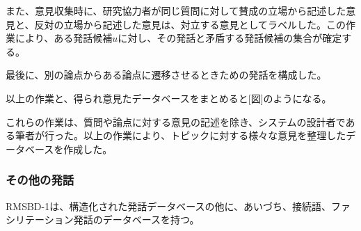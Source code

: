 \documentclass[11pt, a4paper]{jreport} %
\begin{document}
\begin{enumerate}
また、意見収集時に、研究協力者が同じ質問に対して賛成の立場から記述した意見と、反対の立場から記述した意見は、対立する意見としてラベルした。この作業により、ある発話候補$u$に対し、その発話と矛盾する発話候補の集合が確定する。


最後に、別の論点からある論点に遷移させるときための発話を構成した。



以上の作業と、得られ意見たデータベースをまとめると[図]のようになる。


これらの作業は、質問や論点に対する意見の記述を除き、システムの設計者である筆者が行った。以上の作業により、トピックに対する様々な意見を整理したデータベースを作成した。
\end{enumerate}
\subsubsection*{その他の発話}
RMSBD-1は、構造化された発話データベースの他に、あいづち、接続語、ファシリテーション発話のデータベースを持つ。
\end{document}
